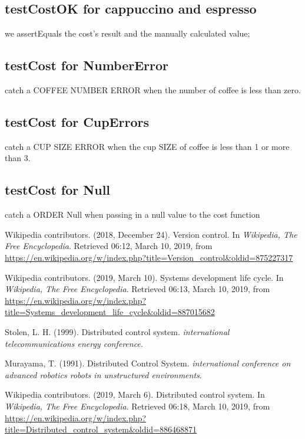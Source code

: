 \documentclass[a4paper]{report}
\begin{document}
\subsection{testCostOK for cappuccino and espresso}
\par we assertEquals the cost's result and the manually calculated value;

\subsection{testCost for NumberError}
\par catch a COFFEE NUMBER ERROR when the number of coffee is less than zero.

\subsection{testCost for CupErrors}
\par catch a CUP SIZE ERROR when the cup SIZE of coffee is less than 1 or more than 3.

\subsection{testCost for Null}
\par catch a ORDER Null when passing in a null value to the cost function
\begin{thebibliography}{A}

Wikipedia contributors. (2018, December 24). Version control. In \emph{Wikipedia, The Free Encyclopedia}. Retrieved 06:12, March 10, 2019, from \url{https://en.wikipedia.org/w/index.php?title=Version_control&oldid=875227317}

Wikipedia contributors. (2019, March 10). Systems development life cycle. In \emph{Wikipedia, The Free Encyclopedia}. Retrieved 06:13, March 10, 2019, from \url{https://en.wikipedia.org/w/index.php?title=Systems_development_life_cycle&oldid=887015682}

Stolen, L. H. (1999). Distributed control system. \emph{international telecommunications energy conference.}

Murayama, T. (1991). Distributed Control System. \emph{international conference on advanced robotics robots in unstructured environments}.

Wikipedia contributors. (2019, March 6). Distributed control system. In \emph{Wikipedia, The Free Encyclopedia}. Retrieved 06:18, March 10, 2019, from \url{https://en.wikipedia.org/w/index.php?title=Distributed_control_system&oldid=886468871}

\end{thebibliography}
\end{document}
